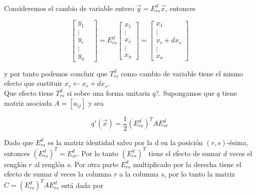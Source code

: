 \paragraph{}
Consideremos el cambio de variable entero $\overrightarrow{y} = E_{rs}^{d}\overrightarrow{x}$, entonces

\begin{equation*}
    \begin{bmatrix}
    y_{1}\\
    \vdots\\
    y_{r}\\
    \vdots\\
    y_{n}&
    \end{bmatrix} = E_{rs}^{d}\begin{bmatrix}
    x_{1}\\
    \vdots\\
    x_{r}\\
    \vdots\\
    x_{n}
    \end{bmatrix} = \begin{bmatrix}
     x_{1}\\
    \vdots\\
    x_{r} + dx_{s}\\
    \vdots\\
    x_{n}
    \end{bmatrix}
\end{equation*}

y por tanto podemos concluir que $T_{rs}^{d}$ como cambio de variable tiene el mismo efecto que sustituir $x_{r} \leftarrow x_{r} + dx_{s}$.\\ Que efecto tiene $T_{rs}^{d}$ si sobre una forma unitaria $q$?. Supongamos que $q$ tiene matriz asociada $A = \left[a_{ij}\right]$ y sea

\begin{equation*}
    q'(\overrightarrow{x}) = \frac{1}{2}\left(E_{rs}^{d}\right)^{T} A E_{sr}^{d}
\end{equation*}

Dado que $E_{rs}^{d}$ es la matriz identidad salvo por la d en la posición $(r, s)$-ésima, entonces $\left(E_{rs}^{d}\right)^{T} = E_{sr}^{d}$. Por lo tanto $\left(E_{rs}^{d}\right)^{T}$ tiene el efecto de sumar $d$ veces el renglón $r$ al renglón $s$. Por otra parte $E_{rs}^{d}$ multiplicado por la derecha tiene el efecto de sumar $d$ veces la columna $r$ a la columna $s$, por lo tanto la matriz $C = \left(E_{rs}^{d}\right)^{T} A E_{rs}^{d}$ está dada por


